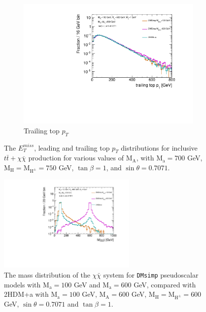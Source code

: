\begin{figure}
\begin{subfigure}[b]{0.49\textwidth}
    \includegraphics[width=\textwidth]{texinputs/04_grid/figures/DMHF/benchmarking/MDM_1_Ma_100_MA_600_sinp_0.7071_tanb_1.0_VS_DMSimp_100_600_Decayed/top2ptlog.pdf}
    \caption{Trailing top $p_{T}$}
  \end{subfigure}
  \caption{The $E_{T}^{miss}$, leading and trailing top $p_{T}$ distributions for inclusive $t\bar{t}+\chi\bar{\chi}$ production for various values of $\mathrm{M_A}$, with $\mathrm{M_a}=700$ GeV, $\mathrm{M_H}=\mathrm{M_{H^{\pm}}}=750$ GeV, $\tan\beta=1$, and $\sin\theta=0.7071$.}
  \label{fig:kin_DMSimpV2HDMa}
\end{figure}

\begin{figure}
  \centering
  \includegraphics[width=0.6\textwidth]{texinputs/04_grid/figures/DMHF/benchmarking/MDM_1_Ma_100_MA_600_sinp_0.7071_tanb_1.0_VS_DMSimp_100_600_Decayed/mchichi.pdf}
  \caption{The mass distribution of the $\chi\bar{\chi}$ system for \texttt{DMsimp} pseudoscalar models with $\mathrm{M_a}=100$ GeV and $\mathrm{M_a}=600$ GeV, compared with 2HDM+a with $\mathrm{M_a}=100$ GeV, $\mathrm{M_A}=600$ GeV, $\mathrm{M_H}=\mathrm{M_{H^{\pm}}}=600$ GeV, $\sin\theta=0.7071$ and $\tan\beta=1$.}
  \label{fig:mchichi_DMsimpV2HDMa}
\end{figure}


